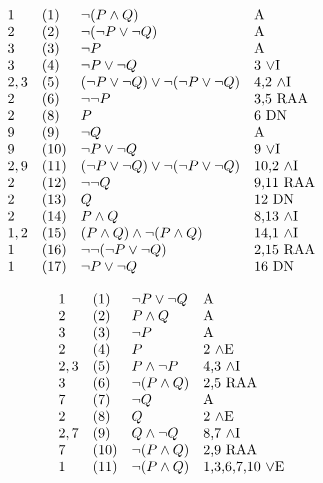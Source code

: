 \documentclass{article}
\begin{document}
\[ \begin{array}{l l l p{3cm}}
     1 & (1) & \neg (P\wedge Q) & A \\
     2 & (2) & \neg (\neg P\vee \neg Q) & A \\
     3 & (3) & \neg P                   & A \\
     3 & (4) & \neg P\vee\neg Q   & 3 $\vee$I \\
     2,3 & (5) & (\neg P\vee\neg Q)\vee \neg (\neg P\vee\neg Q) & 4,2 $\wedge$I \\
     2   & (6) & \neg\neg P       & 3,5 RAA \\
     2   & (8) & P                & 6 DN    \\
     9   & (9) & \neg Q                   & A \\
     9 & (10) & \neg P\vee\neg Q   & 9 $\vee$I \\
     2,9 & (11) & (\neg P\vee\neg Q)\vee \neg (\neg P\vee\neg Q) & 10,2 $\wedge$I \\
     2   & (12) & \neg\neg Q       & 9,11 RAA \\
     2   & (13) & Q                & 12 DN    \\
     2   & (14) & P\wedge Q        & 8,13 $\wedge$I \\
     1,2 & (15) & (P\wedge Q)\wedge \neg (P\wedge Q) & 14,1 $\wedge$I \\
     1   & (16) & \neg\neg (\neg P\vee\neg Q) & 2,15 RAA \\
     1   & (17) & \neg P\vee\neg Q            & 16 DN \end{array}
 \]

 
\[ \begin{array}{l l l p{3cm}}
     1 & (1) & \neg P\vee \neg Q &  A \\
     2 & (2) & P\wedge Q         &  A \\
     3 & (3) & \neg P            &  A \\
     2 & (4) & P                 & 2 $\wedge$E \\
     2,3 & (5) & P\wedge\neg P   & 4,3 $\wedge$I \\
     3   & (6) & \neg (P\wedge Q) & 2,5 RAA \\
     7   & (7) & \neg Q           & A \\
     2   & (8) & Q                & 2 $\wedge$E \\
     2,7 & (9) & Q\wedge\neg Q    & 8,7 $\wedge$I \\
     7   & (10) & \neg (P\wedge Q) & 2,9 RAA \\
     1   & (11) & \neg (P\wedge Q) & 1,3,6,7,10 $\vee$E \end{array} \] 
     
\end{document}
